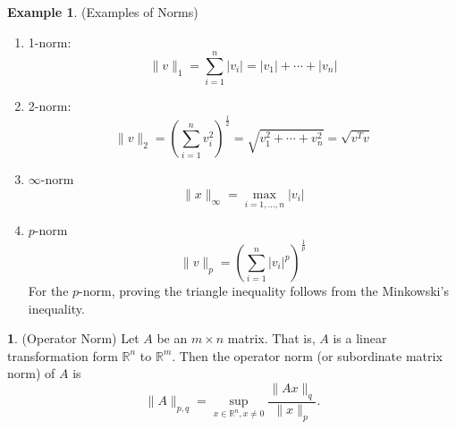 \documentclass[12pt]{article}
\theoremstyle{definition}
\newtheorem{definition}{\color{NavyBlue}{\textbf{Definition}}}
\newcommand{\R}{\mathbb{R}}
\newcommand{\norm}[1]{\lVert#1\rVert}
\newtheorem{example}{\color{WildStrawberry}Example}
\theoremstyle{definition}
\begin{document}
\begin{example}(Examples of Norms)
\begin{enumerate}
	\item 1-norm:
	\begin{equation}
		\norm{v}_1 = \sum_{i=1}^n |v_i| = |v_1| + \cdots + |v_n|
	\end{equation}
	\item 2-norm:
	\begin{equation}
		\norm{v}_2 = \left( \sum_{i=1}^n v_i^2 \right)^{\frac{1}{2}} = \sqrt{v_1^2 + \cdots + v_n^2} = \sqrt{v^T v}
	\end{equation}
	\item $\infty$-norm
	\begin{equation}
		\norm{x}_{\infty} = \max_{i=1, \ldots, n} |v_i|
	\end{equation}
	\item $p$-norm
	\begin{equation}
		\norm{v}_p = \left( \sum_{i=1}^n |v_i|^p \right)^{\frac{1}{p}}
	\end{equation}
	For the $p$-norm, proving the triangle inequality follows from the Minkowski's inequality.
\end{enumerate}
\end{example}

\begin{definition}(Operator Norm)
Let $A$ be an $m \times n$ matrix. That is, $A$ is a linear transformation form $\R^n$ to $\R^m$. Then the operator norm (or subordinate matrix norm) of $A$ is
\begin{equation}
	\norm{A}_{p,q} = \sup_{x \in \R^n, x\neq 0} \frac{\norm{Ax}_q}{\norm{x}_p}.
\end{equation}
\end{definition}
\end{document}

